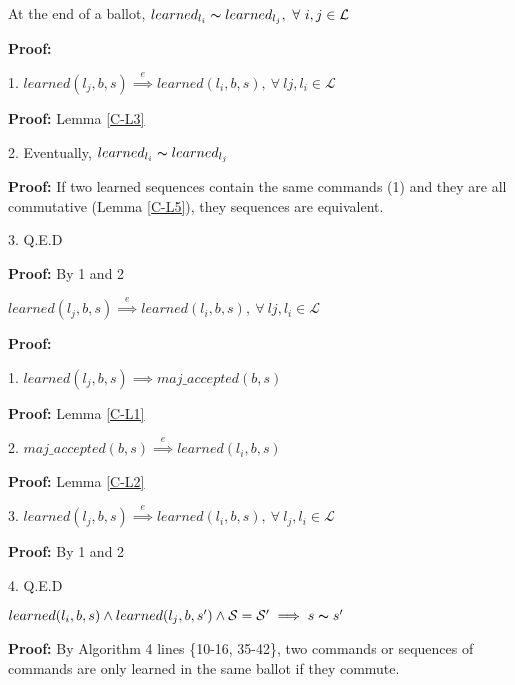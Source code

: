 \begin{lemma}
At the end of a ballot, $learned_{l_i} \thicksim learned_{l_j},\ \forall\ i,j \in \mathcal{L}$ \label{C-L4} \par
\end{lemma}
\textbf{Proof:} \par
1.  $learned(l_j,b,s) \overset{e}{\implies} learned(l_i,b,s),\ \forall\ lj, l_i \in \mathcal{L}$\par
\indent\indent\textbf{Proof:} Lemma \ref{C-L3} \par
2. Eventually, $learned_{l_i} \thicksim learned_{l_j}$  \par
\indent\indent\textbf{Proof:} If two learned sequences contain the same commands (1) and they are all commutative (Lemma \ref{C-L5}), they sequences are equivalent.\par
3. Q.E.D \par
\indent\indent\textbf{Proof:} By 1 and 2\par

\begin{lemma}
	$learned(l_j,b,s) \overset{e}{\implies} learned(l_i,b,s),\ \forall\ lj, l_i \in \mathcal{L}$ \label{C-L3} \par
\end{lemma}
\textbf{Proof:} \par
1. $learned(l_j,b,s) \implies maj\_accepted(b,s)$\par
\indent\indent\textbf{Proof:} Lemma \ref{C-L1} \par
2. $maj\_accepted(b,s) \overset{e}{\implies} learned(l_i,b,s)$ \par
\indent\indent\textbf{Proof:} Lemma \ref{C-L2} \par
3. $learned(l_j,b,s) \overset{e}{\implies} learned(l_i,b,s),\ \forall\ l_j,l_i \in \mathcal{L}$ \par
\indent\indent\textbf{Proof:} By 1 and 2\par
4. Q.E.D \par


\begin{lemma}
$learned(l_i,b,s) \land learned(l_j,b,s') \land \mathcal{S} = \mathcal{S'} \implies s \thicksim s'$  \label{C-L5} \par
\end{lemma}
\textbf{Proof:} By Algorithm 4 lines \{10-16, 35-42\}, two commands or sequences of commands are only learned in the same ballot if they commute.


